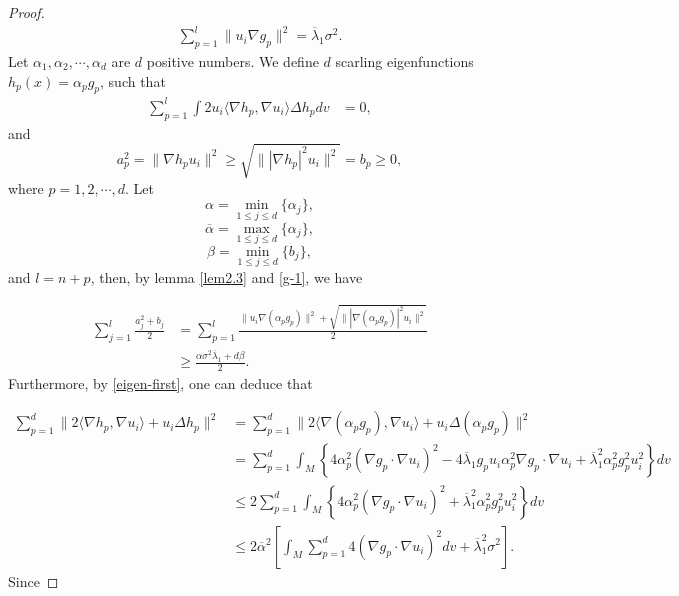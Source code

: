 \documentclass[12pt]{article}
\numberwithin{equation}{section}
\begin{document}
\begin{proof}
 \begin{equation}\begin{aligned}\label{g-1}\sum^{l}_{p=1}
\|u_{i}\nabla g_{p}\|^{2} =\overline{\lambda}_{1}\sigma^{2}.
\end{aligned}\end{equation}Let $\alpha_{1},\alpha_{2},\cdots,\alpha_{d}$ are $d$ positive numbers. We define $d$ scarling eigenfunctions $h_{p}(x)=\alpha_{p}g_{p}$, such that
\begin{equation}\begin{aligned}\label{su-0} \sum_{p=1}^{l}\int2 u_{i}\langle\nabla h_{p},\nabla u_{i}\rangle\Delta  h_{p}dv&=0,\end{aligned}\end{equation}
and
\begin{equation*}a_{p}^{2}=\|\nabla h_{p}u_{i}\|^{2}\geq\sqrt{\||\nabla h_{p}|^{2}u_{i}\|^{2}}=b_{p}\geq0,\end{equation*} where   $p=1,2,\cdots,d$.
Let $$\alpha=\min_{1\leq j\leq d}\{\alpha_{j}\},$$$$\overline{\alpha}=\max_{1\leq j\leq d}\{\alpha_{j}\},$$$$\beta=\min_{1\leq j\leq d}\{b_{j}\},$$
and $l=n+p$, then, by lemma \ref{lem2.3} and \eqref{g-1}, we have


\begin{equation}\begin{aligned}\label{a-b-20}\sum_{j=1}^{l}\frac{a_{j}^{2}+b_{j}}{2}
&=\sum^{l}_{p=1}
\frac{\|u_{i}\nabla(\alpha_{p} g_{p})\|^{2} +\sqrt{\||\nabla (\alpha_{p}g_{p})|^{2}u_{i}\|^{2}}}{2}\\&
\geq\frac{\alpha\sigma^{2}\overline{\lambda}_{1}+d\beta}{2}.
\end{aligned}\end{equation}
Furthermore, by \eqref{eigen-first}, one can deduce that

 \begin{equation}\begin{aligned}\label{(2.30)}\sum_{p=1}^{d}\|2\langle\nabla h_{p},\nabla u_{i}\rangle+u_{i}\Delta h_{p}\|^{2}&
=\sum_{p=1}^{d}\|2\langle\nabla (\alpha_{p}g_{p}),\nabla u_{i}\rangle+u_{i}\Delta (\alpha_{p}g_{p})\|^{2}\\
& =
\sum^{d}_{p=1}\int
_{M}
\left\{4\alpha_{p}^{2}(\nabla g_{p}\cdot\nabla u_{i})^{2}-4\overline{\lambda}_{1}g_{p}u_{i}\alpha_{p}^{2}
\nabla g_{p}\cdot\nabla u_{i} +\overline{\lambda}^{2}_{1}\alpha_{p}^{2}g^{2}_{p}u^{2}_{i}\right\}dv\\
&\leq2\sum^{d}_{p=1}\int
_{M}
\left\{4\alpha_{p}^{2}(\nabla g_{p}\cdot\nabla u_{i})^{2} +\overline{\lambda}^{2}_{1}\alpha_{p}^{2}g^{2}_{p}u^{2}_{i}\right\}dv\\
&\leq2\overline{\alpha}^{2}\left[\int_{M}
\sum^{d}_{p=1}
4(\nabla g_{p} \cdot\nabla u_{i})^{2}dv +\overline{\lambda}^{2}_{1}\sigma^{2}\right].
\end{aligned}\end{equation}
Since


\end{proof}
\end{document}
